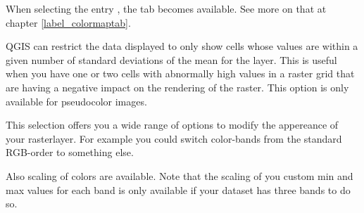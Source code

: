 When selecting the entry , the tab
 becomes available. See more on that at chapter
\ref{label_colormaptab}.

QGIS can restrict the data displayed to only show cells whose values are
within a given number of standard deviations of the mean for the
layer. This is useful when you have one or
two cells with abnormally high values in a raster grid that are having a
negative impact on the rendering of the raster. This option is only available
for pseudocolor images.



This selection offers you a wide range of options to modify the appereance
of your rasterlayer. For example you could switch color-bands from the
standard RGB-order to something else.

Also scaling of colors are available.
Note that the scaling of you custom min and max values for each band is
only available if your dataset has three bands to do so.


